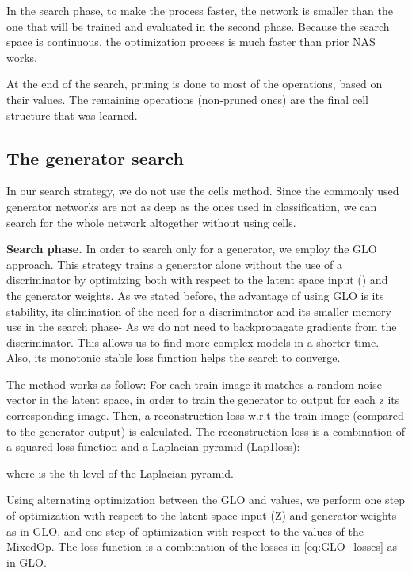\documentclass[10pt,twocolumn,letterpaper]{article}
\begin{document}
In the search phase, to make the process faster, the network is smaller than the one that will be trained and evaluated in the second phase.
Because the search space is continuous, the optimization process is much faster than prior NAS works.

At the end of the search, pruning is done to most of the operations, based on their  values. The remaining operations (non-pruned ones) are the final cell structure that was learned.
 
\subsection{The generator search}
In our search strategy, we do not use the cells method.
Since the commonly used generator networks are not as deep as the ones used in classification, we can search for the whole network altogether without using cells.



{\bf Search phase.} 
In order to search only for a generator, we employ the GLO approach.
This strategy trains a generator alone without the use of a discriminator by optimizing both with respect to the latent space input () and the generator weights. As we stated before, the advantage of using GLO is its stability, its elimination of the need for a discriminator and its smaller memory use in the search phase- As we do not need to backpropagate gradients from the discriminator. This allows us to find more complex models in a shorter time.
Also, its monotonic stable loss function helps the search to converge.






The method works as follow: For each train image it matches a random noise vector  in the latent space, in order to train the generator to output for each z its corresponding image. Then, a reconstruction loss w.r.t the train image (compared to the generator output) is calculated. The reconstruction loss is a combination of a squared-loss function and a Laplacian pyramid (Lap1loss):

where  is the th level of the Laplacian pyramid.

Using alternating optimization between the GLO and  values, we perform one step of optimization with respect to the latent space input (Z) and generator weights as in GLO, and one step of optimization with respect to the  values of the MixedOp. The loss function is a combination of the losses in \eqref{eq:GLO_losses} as in GLO.
\end{document}
